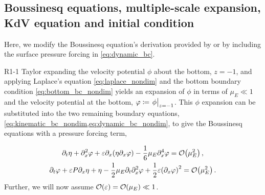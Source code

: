 \documentclass{jfm}
\renewcommand*{\epsilon}{\varepsilon}
\begin{document}
\subsection{\label{sec:boussinesq} Boussinesq equations, multiple-scale
expansion, KdV equation and initial condition}
Here, we modify the Boussinesq equation's derivation provided by
\citet{mei2005nonlinear} or \citet{ablowitz2011nonlinear} by including
the surface pressure forcing in \cref{eq:dynamic_bc}.
\begin{LineLabel}{R1-1}
Taylor expanding the velocity potential $\phi$ about the bottom,
$z=-1$, and applying Laplace's
equation \cref{eq:laplace_nondim} and the bottom boundary
condition \cref{eq:bottom_bc_nondim} yields an expansion of $\phi$ in
terms of $\mu_E \ll 1$ and the velocity potential at the bottom,
$\varphi \coloneqq \eval{\phi}_{z=-1}$.
This $\phi$ expansion can be substituted into the two remaining boundary
equations, \cref{eq:kinematic_bc_nondim,eq:dynamic_bc_nondim}, to give
the Boussinesq equations with a pressure forcing term,
\end{LineLabel}
\begin{gather}
  \partial_t \eta + \partial_x^2 \varphi + \epsilon \partial_x
    \pqty{\eta \partial_x \varphi} -\frac{1}{6}\mu_E \partial^4_x
    \varphi = \order{\mu_E^2} \label{eq:kinematic_bc_varphi} \,, \\
  \partial_t \varphi + \epsilon P \partial_x \eta + \eta -
    \frac{1}{2}\mu_E \partial_t \partial_x^2 \varphi +
    \frac{1}{2}\epsilon\pqty{\partial_x \varphi}^2 = \order{\mu_E^2} \,.
    \label{eq:dynamic_bc_varphi}
\end{gather}
Further, we will now assume $\order{\epsilon} = \order{\mu_E} \ll 1$.
\end{document}
